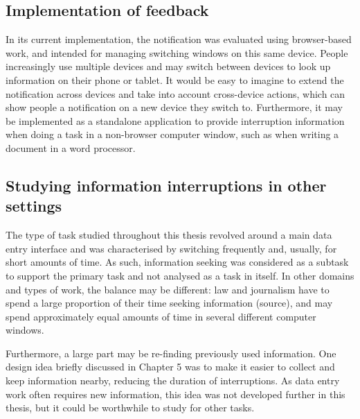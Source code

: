 \subsection{Implementation of feedback}
In its current implementation, the notification was evaluated using browser-based work, and intended for managing switching windows on this same device. People increasingly use multiple devices and may switch between devices to look up information on their phone or tablet. It would be easy to imagine to extend the notification across devices and take into account cross-device actions, which can show people a notification on a new device they switch to. Furthermore, it may be implemented as a standalone application to provide interruption information when doing a task in a non-browser computer window, such as when writing a document in a word processor.

\subsection{Studying information interruptions in other settings}
The type of task studied throughout this thesis revolved around a main data entry interface and was characterised by switching frequently and, usually, for short amounts of time. As such, information seeking was considered as a subtask to support the primary task and not analysed as a task in itself. In other domains and types of work, the balance may be different: law and journalism have to spend a large proportion of their time seeking information (source), and may spend approximately equal amounts of time in several different computer windows. 

Furthermore, a large part may be re-finding previously used information. One design idea briefly discussed in Chapter 5 was to make it easier to collect and keep information nearby, reducing the duration of interruptions. As data entry work often requires new information, this idea was not developed further in this thesis, but it could be worthwhile to study for other tasks. 

